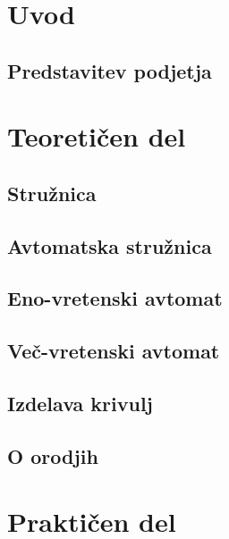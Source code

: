 \documentclass[a4paper, 12pt, fleqn]{article}
\begin{document}
\begin{sloppypar}
	\section{Uvod}
	\subsection{Predstavitev podjetja}
	
	\newpage
	
	\section{Teoretičen del}
	\subsection{Stružnica}
	
	
	\subsection{Avtomatska stružnica}
	
	
	\subsection{Eno-vretenski avtomat}
	
	
	\subsection{Več-vretenski avtomat}
	
	
	\subsection{Izdelava krivulj}
	
	
	\subsection{O orodjih}
	
	
	\newpage
	\section{Praktičen del}
	
	
	
	
	
	
	
	
	
	
\end{sloppypar}

\newpage

\renewcommand{\refname}{Viri}



\end{document}
